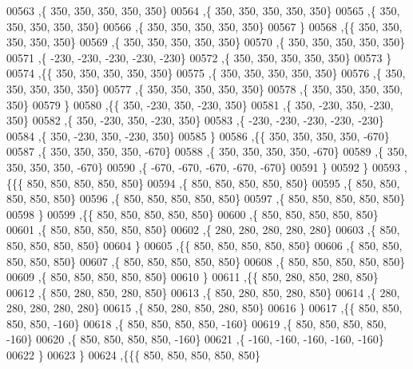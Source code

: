 \begin{DoxyCode}
00563    ,\{   350,   350,   350,   350,   350\}
00564    ,\{   350,   350,   350,   350,   350\}
00565    ,\{   350,   350,   350,   350,   350\}
00566    ,\{   350,   350,   350,   350,   350\}
00567    \}
00568   ,\{\{   350,   350,   350,   350,   350\}
00569    ,\{   350,   350,   350,   350,   350\}
00570    ,\{   350,   350,   350,   350,   350\}
00571    ,\{  -230,  -230,  -230,  -230,  -230\}
00572    ,\{   350,   350,   350,   350,   350\}
00573    \}
00574   ,\{\{   350,   350,   350,   350,   350\}
00575    ,\{   350,   350,   350,   350,   350\}
00576    ,\{   350,   350,   350,   350,   350\}
00577    ,\{   350,   350,   350,   350,   350\}
00578    ,\{   350,   350,   350,   350,   350\}
00579    \}
00580   ,\{\{   350,  -230,   350,  -230,   350\}
00581    ,\{   350,  -230,   350,  -230,   350\}
00582    ,\{   350,  -230,   350,  -230,   350\}
00583    ,\{  -230,  -230,  -230,  -230,  -230\}
00584    ,\{   350,  -230,   350,  -230,   350\}
00585    \}
00586   ,\{\{   350,   350,   350,   350,  -670\}
00587    ,\{   350,   350,   350,   350,  -670\}
00588    ,\{   350,   350,   350,   350,  -670\}
00589    ,\{   350,   350,   350,   350,  -670\}
00590    ,\{  -670,  -670,  -670,  -670,  -670\}
00591    \}
00592   \}
00593  ,\{\{\{   850,   850,   850,   850,   850\}
00594    ,\{   850,   850,   850,   850,   850\}
00595    ,\{   850,   850,   850,   850,   850\}
00596    ,\{   850,   850,   850,   850,   850\}
00597    ,\{   850,   850,   850,   850,   850\}
00598    \}
00599   ,\{\{   850,   850,   850,   850,   850\}
00600    ,\{   850,   850,   850,   850,   850\}
00601    ,\{   850,   850,   850,   850,   850\}
00602    ,\{   280,   280,   280,   280,   280\}
00603    ,\{   850,   850,   850,   850,   850\}
00604    \}
00605   ,\{\{   850,   850,   850,   850,   850\}
00606    ,\{   850,   850,   850,   850,   850\}
00607    ,\{   850,   850,   850,   850,   850\}
00608    ,\{   850,   850,   850,   850,   850\}
00609    ,\{   850,   850,   850,   850,   850\}
00610    \}
00611   ,\{\{   850,   280,   850,   280,   850\}
00612    ,\{   850,   280,   850,   280,   850\}
00613    ,\{   850,   280,   850,   280,   850\}
00614    ,\{   280,   280,   280,   280,   280\}
00615    ,\{   850,   280,   850,   280,   850\}
00616    \}
00617   ,\{\{   850,   850,   850,   850,  -160\}
00618    ,\{   850,   850,   850,   850,  -160\}
00619    ,\{   850,   850,   850,   850,  -160\}
00620    ,\{   850,   850,   850,   850,  -160\}
00621    ,\{  -160,  -160,  -160,  -160,  -160\}
00622    \}
00623   \}
00624  ,\{\{\{   850,   850,   850,   850,   850\}

\end{DoxyCode}
